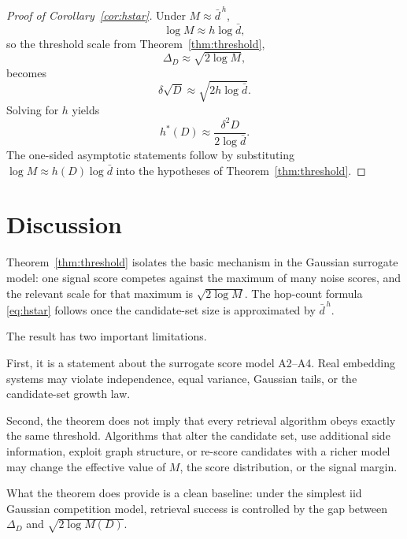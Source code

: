 \documentclass[11pt]{article}
\begin{document}
\begin{proof}[Proof of Corollary~\ref{cor:hstar}]
Under $M \approx \bar d^{\,h}$,
\[
\log M \approx h\log\bar d,
\]
so the threshold scale from Theorem~\ref{thm:threshold},
\[
\Delta_D \approx \sqrt{2\log M},
\]
becomes
\[
\delta\sqrt{D} \approx \sqrt{2h\log\bar d}.
\]
Solving for $h$ yields
\[
h^*(D) \approx \frac{\delta^2 D}{2\log\bar d}.
\]
The one-sided asymptotic statements follow by substituting $\log M \approx h(D)\log\bar d$ into the hypotheses of Theorem~\ref{thm:threshold}.
\end{proof}

\section{Discussion}

Theorem~\ref{thm:threshold} isolates the basic mechanism in the Gaussian surrogate model: one signal score competes against the maximum of many noise scores, and the relevant scale for that maximum is $\sqrt{2\log M}$. The hop-count formula \eqref{eq:hstar} follows once the candidate-set size is approximated by $\bar d^{\,h}$.

The result has two important limitations.

First, it is a statement about the surrogate score model A2--A4. Real embedding systems may violate independence, equal variance, Gaussian tails, or the candidate-set growth law.

Second, the theorem does not imply that every retrieval algorithm obeys exactly the same threshold. Algorithms that alter the candidate set, use additional side information, exploit graph structure, or re-score candidates with a richer model may change the effective value of $M$, the score distribution, or the signal margin.

What the theorem does provide is a clean baseline: under the simplest iid Gaussian competition model, retrieval success is controlled by the gap between $\Delta_D$ and $\sqrt{2\log M(D)}$.
\end{document}
